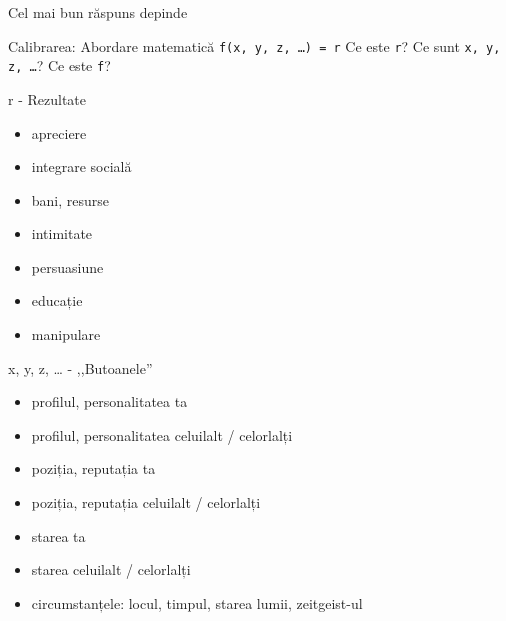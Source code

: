 \documentclass{simple}
\begin{document}
\begin{frame}{Cel mai bun răspuns}
  \centering
  \Large
  \pause depinde
\end{frame}

\begin{frame}{Calibrarea: Abordare matematică}
  \centering
  \Large
  \pause \texttt{f(x, y, z, \ldots{}) = r}
  \vspace{3mm}
  \pause Ce este \texttt{r}?
  \vspace{3mm}
  \pause Ce sunt \texttt{x, y, z, \ldots{}}?
  \vspace{3mm}
  \pause Ce este \texttt{f}?
\end{frame}

\begin{frame}{r - Rezultate}
  \begin{itemize}
    \pause \item apreciere
    \pause \item integrare socială
    \pause \item bani, resurse
    \pause \item intimitate
    \pause \item persuasiune
    \pause \item educație
    \pause \item manipulare
  \end{itemize}
\end{frame}

\begin{frame}{x, y, z, \ldots{} - ,,Butoanele''}
  \begin{itemize}
    \pause \item profilul, personalitatea ta
    \pause \item profilul, personalitatea celuilalt / celorlalți
    \pause \item poziția, reputația ta
    \pause \item poziția, reputația celuilalt / celorlalți
    \pause \item starea ta
    \pause \item starea celuilalt / celorlalți
    \pause \item circumstanțele: locul, timpul, starea lumii, zeitgeist-ul
  \end{itemize}
\end{frame}
\end{document}
